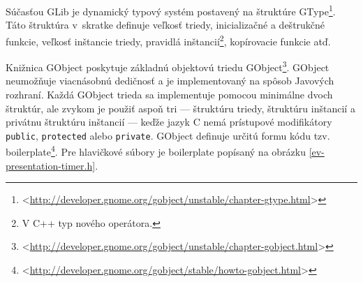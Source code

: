 \documentclass[12pt,oneside,final]{fithesis2}
\begin{document}
Súčasťou GLib je dynamický typový systém postavený na štruktúre GType\footnote{<\url{http://developer.gnome.org/gobject/unstable/chapter-gtype.html}>}. Táto štruktúra v~skratke definuje veľkosť triedy, inicializačné a deštrukčné funkcie, veľkosť inštancie triedy, pravidlá inštancií\footnote{V C++ typ nového operátora.}, kopírovacie funkcie atď.

Knižnica GObject poskytuje základnú objektovú triedu GObject\footnote{<\url{http://developer.gnome.org/gobject/unstable/chapter-gobject.html}>}. GObject neumožňuje viacnásobnú dedičnosť a je implementovaný na spôsob Javových rozhraní. Každá GObject trieda sa implementuje pomocou minimálne dvoch štruktúr, ale zvykom je použiť aspoň tri --- štruktúru triedy, štruktúru inštancií a privátnu štruktúru inštancií --- keďže jazyk C nemá prístupové modifikátory \texttt{public}, \texttt{protected} alebo \texttt{private}. GObject definuje určitú formu kódu tzv. boilerplate\footnote{<\url{http://developer.gnome.org/gobject/stable/howto-gobject.html}>}.
Pre hlavičkové súbory je boilerplate popísaný na obrázku \ref{ev-presentation-timer.h}.
\end{document}

